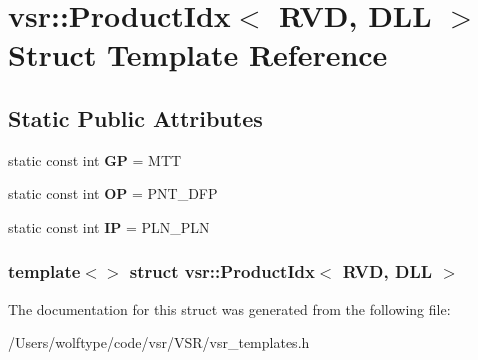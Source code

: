 \hypertarget{structvsr_1_1_product_idx_3_01_r_v_d_00_01_d_l_l_01_4}{\section{vsr\-:\-:Product\-Idx$<$ R\-V\-D, D\-L\-L $>$ Struct Template Reference}
\label{structvsr_1_1_product_idx_3_01_r_v_d_00_01_d_l_l_01_4}
}
\subsection*{Static Public Attributes}
\begin{DoxyCompactItemize}
\item 
\hypertarget{structvsr_1_1_product_idx_3_01_r_v_d_00_01_d_l_l_01_4_a0554dd4e143011cd35d939442394db1d}{static const int {\bfseries G\-P} = M\-T\-T}\label{structvsr_1_1_product_idx_3_01_r_v_d_00_01_d_l_l_01_4_a0554dd4e143011cd35d939442394db1d}

\item 
\hypertarget{structvsr_1_1_product_idx_3_01_r_v_d_00_01_d_l_l_01_4_aba844c396c41b28962f7903d498d0b96}{static const int {\bfseries O\-P} = P\-N\-T\-\_\-\-D\-F\-P}\label{structvsr_1_1_product_idx_3_01_r_v_d_00_01_d_l_l_01_4_aba844c396c41b28962f7903d498d0b96}

\item 
\hypertarget{structvsr_1_1_product_idx_3_01_r_v_d_00_01_d_l_l_01_4_a5a176c1689354f971f68029260fe837d}{static const int {\bfseries I\-P} = P\-L\-N\-\_\-\-P\-L\-N}\label{structvsr_1_1_product_idx_3_01_r_v_d_00_01_d_l_l_01_4_a5a176c1689354f971f68029260fe837d}

\end{DoxyCompactItemize}
\subsubsection*{template$<$$>$ struct vsr\-::\-Product\-Idx$<$ R\-V\-D, D\-L\-L $>$}



The documentation for this struct was generated from the following file\-:\begin{DoxyCompactItemize}
\item 
/\-Users/wolftype/code/vsr/\-V\-S\-R/vsr\-\_\-templates.\-h\end{DoxyCompactItemize}
